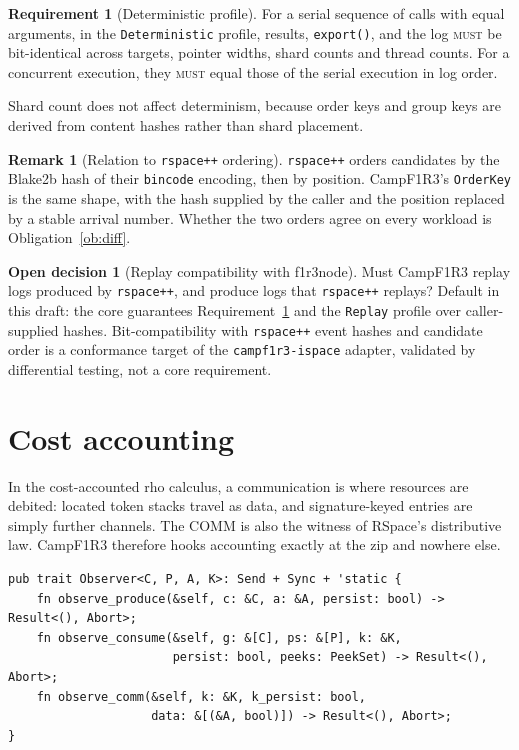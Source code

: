 \documentclass[11pt]{article}
\theoremstyle{plain}
\theoremstyle{definition}
\newtheorem{requirement}{Requirement}
\newtheorem{remark}[proposition]{Remark}
\newtheorem{decision}{Open decision}
\newcommand{\Camp}{CampF1R3}
\newcommand{\MUST}{\textsc{must}}
\newcommand{\code}[1]{\texttt{#1}}
\begin{document}
\begin{requirement}[Deterministic profile]\label{req:det}
For a serial sequence of calls with equal arguments, in the \code{Deterministic}
profile, results, \code{export()}, and the log \MUST{} be bit-identical across
targets, pointer widths, shard counts and thread counts. For a concurrent execution,
they \MUST{} equal those of the serial execution in log order.
\end{requirement}

Shard count does not affect determinism, because order keys and group keys are derived
from content hashes rather than shard placement.

\begin{remark}[Relation to \code{rspace++} ordering]
\code{rspace++} orders candidates by the Blake2b hash of their \code{bincode} encoding,
then by position. \Camp{}'s \code{OrderKey} is the same shape, with the hash supplied
by the caller and the position replaced by a stable arrival number. Whether the two
orders agree on every workload is Obligation~\ref{ob:diff}.
\end{remark}

\begin{decision}[Replay compatibility with f1r3node]\label{dec:replay}
Must \Camp{} replay logs produced by \code{rspace++}, and produce logs that
\code{rspace++} replays? Default in this draft: the core guarantees
Requirement~\ref{req:det} and the \code{Replay} profile over caller-supplied hashes.
Bit-compatibility with \code{rspace++} event hashes and candidate order is a
conformance target of the \code{campf1r3-ispace} adapter, validated by differential
testing, not a core requirement.
\end{decision}

\section{Cost accounting}\label{sec:accounting}

In the cost-accounted rho calculus, a communication is where resources are debited:
located token stacks travel as data, and signature-keyed entries are simply further
channels. The COMM is also the witness of RSpace's distributive law. \Camp{} therefore
hooks accounting exactly at the zip and nowhere else.

\begin{lstlisting}
pub trait Observer<C, P, A, K>: Send + Sync + 'static {
    fn observe_produce(&self, c: &C, a: &A, persist: bool) -> Result<(), Abort>;
    fn observe_consume(&self, g: &[C], ps: &[P], k: &K,
                       persist: bool, peeks: PeekSet) -> Result<(), Abort>;
    fn observe_comm(&self, k: &K, k_persist: bool,
                    data: &[(&A, bool)]) -> Result<(), Abort>;
}
\end{lstlisting}
\end{document}
